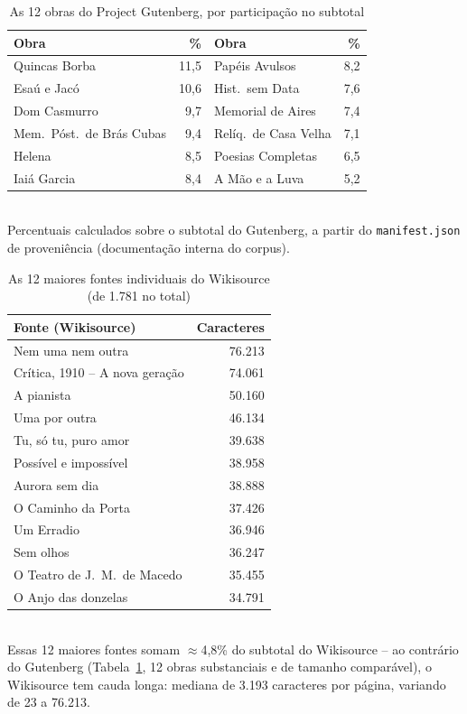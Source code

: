 \documentclass[conference]{IEEEtran}
\begin{document}
\begin{table}[!t]
\centering
\caption{As 12 obras do Project Gutenberg, por participação no subtotal}
\label{tab:gutenberg}
\begin{tabular}{@{}lr@{\hspace{8pt}}lr@{}}
\toprule
Obra & \% & Obra & \% \\
\midrule
Quincas Borba & 11,5 & Papéis Avulsos & 8,2 \\
Esaú e Jacó & 10,6 & Hist.\ sem Data & 7,6 \\
Dom Casmurro & 9,7 & Memorial de Aires & 7,4 \\
Mem.\ Póst.\ de Brás Cubas & 9,4 & Relíq.\ de Casa Velha & 7,1 \\
Helena & 8,5 & Poesias Completas & 6,5 \\
Iaiá Garcia & 8,4 & A Mão e a Luva & 5,2 \\
\bottomrule
\end{tabular}\\[2pt]
{\scriptsize Percentuais calculados sobre o subtotal do Gutenberg, a partir
do \texttt{manifest.json} de proveniência (documentação interna do corpus).}
\end{table}

\begin{table}[!t]
\centering
\caption{As 12 maiores fontes individuais do Wikisource (de 1.781 no total)}
\label{tab:wikisource}
\begin{tabular}{@{}lr@{}}
\toprule
Fonte (Wikisource) & Caracteres \\
\midrule
Nem uma nem outra & 76.213 \\
Crítica, 1910 -- A nova geração & 74.061 \\
A pianista & 50.160 \\
Uma por outra & 46.134 \\
Tu, só tu, puro amor & 39.638 \\
Possível e impossível & 38.958 \\
Aurora sem dia & 38.888 \\
O Caminho da Porta & 37.426 \\
Um Erradio & 36.946 \\
Sem olhos & 36.247 \\
O Teatro de J.\ M.\ de Macedo & 35.455 \\
O Anjo das donzelas & 34.791 \\
\bottomrule
\end{tabular}\\[2pt]
{\scriptsize Essas 12 maiores fontes somam $\approx$4,8\% do subtotal do
Wikisource -- ao contrário do Gutenberg (Tabela~\ref{tab:gutenberg}, 12
obras substanciais e de tamanho comparável), o Wikisource tem cauda longa:
mediana de 3.193 caracteres por página, variando de 23 a 76.213.}
\end{table}
\end{document}
